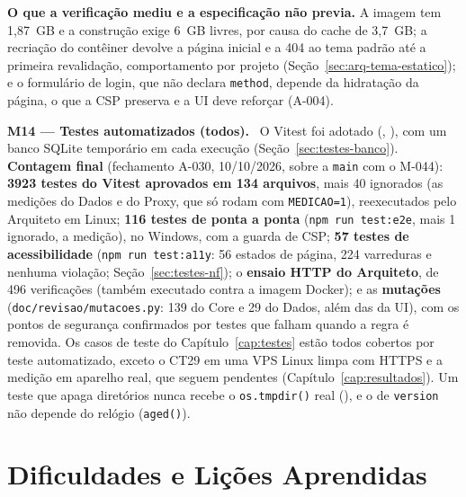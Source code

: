 \textbf{O que a verificação mediu e a especificação não previa.} A imagem tem 1,87~GB e a construção exige 6~GB livres, por causa do cache de 3,7~GB; a recriação do contêiner devolve a página inicial e a 404 ao tema padrão até a primeira revalidação, comportamento por projeto (Seção~\ref{sec:arq-tema-estatico}); e o formulário de login, que não declara \texttt{method}, depende da hidratação da página, o que a CSP preserva e a UI deve reforçar (A-004).

\textbf{M14 --- Testes automatizados (todos).} \ O Vitest foi adotado (, ), com um banco SQLite temporário em cada execução (Seção~\ref{sec:testes-banco}). \textbf{Contagem final} (fechamento A-030, 10/10/2026, sobre a \texttt{main} com o M-044): \textbf{3923 testes do Vitest aprovados em 134 arquivos}, mais 40 ignorados (as medições do Dados e do Proxy, que só rodam com \texttt{MEDICAO=1}), reexecutados pelo Arquiteto em Linux; \textbf{116 testes de ponta a ponta} (\texttt{npm run test:e2e}, mais 1 ignorado, a medição), no Windows, com a guarda de CSP; \textbf{57 testes de acessibilidade} (\texttt{npm run test:a11y}: 56 estados de página, 224 varreduras e nenhuma violação; Seção~\ref{sec:testes-nf}); o \textbf{ensaio HTTP do Arquiteto}, de 496 verificações (também executado contra a imagem Docker); e as \textbf{mutações} (\texttt{doc/revisao/mutacoes.py}: 139 do Core e 29 do Dados, além das da UI), com os pontos de segurança confirmados por testes que falham quando a regra é removida. Os casos de teste do Capítulo~\ref{cap:testes} estão todos cobertos por teste automatizado, exceto o CT29 em uma VPS Linux limpa com HTTPS e a medição em aparelho real, que seguem pendentes (Capítulo~\ref{cap:resultados}). Um teste que apaga diretórios nunca recebe o \texttt{os.tmpdir()} real (), e o de \texttt{version} não depende do relógio (\texttt{aged()}).




\section{Dificuldades e Lições Aprendidas}\label{sec:impl-licoes}

